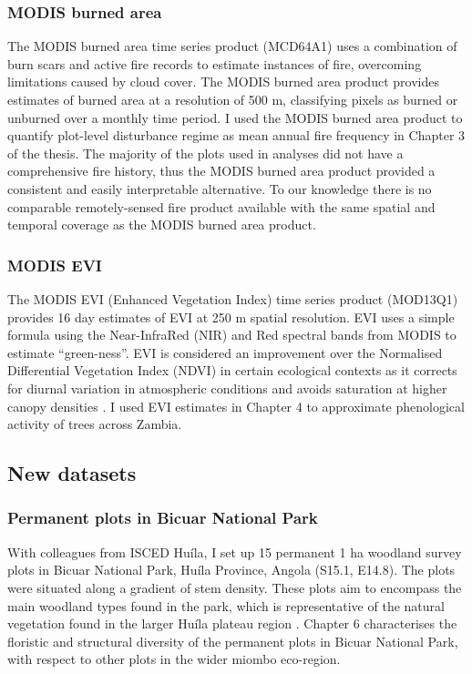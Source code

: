 \begin{refsection}
\subsubsection{MODIS burned area}
\label{intro:sssec:fire}

The MODIS burned area time series product (MCD64A1) \citep{MCD64A1} uses a combination of burn scars and active fire records to estimate instances of fire, overcoming limitations caused by cloud cover. The MODIS burned area product provides estimates of burned area at a resolution of 500 m, classifying pixels as burned or unburned over a monthly time period. I used the MODIS burned area product to quantify plot-level disturbance regime as mean annual fire frequency in Chapter 3 of the thesis. The majority of the plots used in analyses did not have a comprehensive fire history, thus the MODIS burned area product provided a consistent and easily interpretable alternative. To our knowledge there is no comparable remotely-sensed fire product available with the same spatial and temporal coverage as the MODIS burned area product.

\subsubsection{MODIS EVI}
\label{intro:sssec:evi}

The MODIS EVI (Enhanced Vegetation Index) time series product (MOD13Q1) \citep{MOD13Q1} provides 16 day estimates of EVI at 250 m spatial resolution. EVI uses a simple formula using the Near-InfraRed (NIR) and Red spectral bands from MODIS to estimate ``green-ness''. EVI is considered an improvement over the Normalised Differential Vegetation Index (NDVI) in certain ecological contexts as it corrects for diurnal variation in atmospheric conditions and avoids saturation at higher canopy densities \citep{Huete2002}. I used EVI estimates in Chapter 4 to approximate phenological activity of trees across Zambia.

\subsection{New datasets}
\label{intro:ssec:new_data}

\subsubsection{Permanent plots in Bicuar National Park}
\label{intro:sssec:bicuar}

With colleagues from ISCED Hu\'{i}la, I set up 15 permanent 1 ha woodland survey plots in Bicuar National Park, Hu\'{i}la Province, Angola (S15.1\textdegree{}, E14.8\textdegree{}). The plots were situated along a gradient of stem density. These plots aim to encompass the main woodland types found in the park, which is representative of the natural vegetation found in the larger Hu\'{i}la plateau region \citep{Huntley2019}. Chapter 6 characterises the floristic and structural diversity of the permanent plots in Bicuar National Park, with respect to other plots in the wider miombo eco-region.


\end{refsection}
